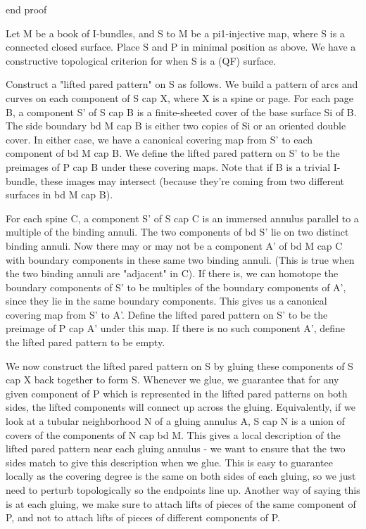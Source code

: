 end proof

Let M be a book of I-bundles, and S to M be a pi1-injective map, where S is
a connected closed surface.  Place S and P in minimal position as above. We
have a constructive topological criterion for when S is a (QF) surface.

Construct a "lifted pared pattern" on S as follows. We build a pattern of arcs
and curves on each component of S cap X, where X is a spine or page. For each
page B, a component S' of S cap B is a finite-sheeted cover of the base surface
Si of B. The side boundary bd M cap B is either two copies of Si or an oriented
double cover. In either case, we have a canonical covering map from S' to each
component of bd M cap B. We define the lifted pared pattern on S' to be the
preimages of P cap B under these covering maps. Note that if B is a trivial
I-bundle, these images may intersect (because they're coming from two different
surfaces in bd M cap B).

For each spine C, a component S' of S cap C is an immersed annulus parallel to
a multiple of the binding annuli.  The two components of bd S' lie on two
distinct binding annuli. Now there may or may not be a component A' of bd M cap
C with boundary components in these same two binding annuli. (This is true when
the two binding annuli are "adjacent" in C). If there is, we can homotope the
boundary components of S' to be multiples of the boundary components of A',
since they lie in the same boundary components. This gives us a canonical
covering map from S' to A'. Define the lifted pared pattern on S' to be the
preimage of P cap A' under this map. If there is no such component A', define
the lifted pared pattern to be empty.

We now construct the lifted pared pattern on S by gluing these components of
S cap X back together to form S. Whenever we glue, we guarantee that for any
given component of P which is represented in the lifted pared patterns on both
sides, the lifted components will connect up across the gluing.  Equivalently,
if we look at a tubular neighborhood N of a gluing annulus A, S cap N is
a union of covers of the components of N cap bd M. This gives a local
description of the lifted pared pattern near each gluing annulus - we want to
ensure that the two sides match to give this description when we glue. This is
easy to guarantee locally as the covering degree is the same on both sides of
each gluing, so we just need to perturb topologically so the endpoints line up.
Another way of saying this is at each gluing, we make sure to attach lifts of
pieces of the same component of P, and not to attach lifts of pieces of
different components of P.

